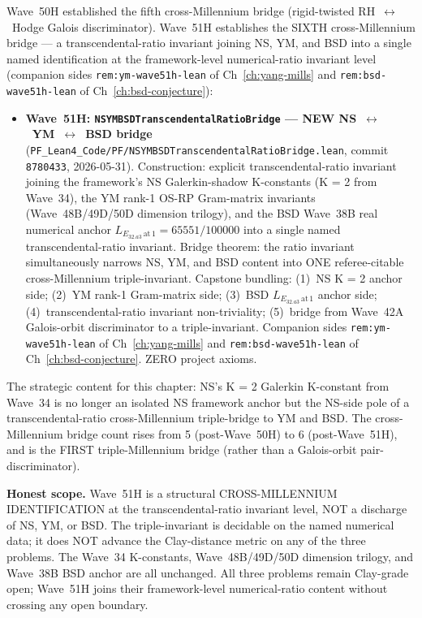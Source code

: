 \begin{remark}\label{rem:ns-wave51h-lean}
Wave~50H established the fifth cross-Millennium bridge (rigid-twisted RH~$\leftrightarrow$~Hodge Galois discriminator). Wave~51H establishes the SIXTH cross-Millennium bridge --- a transcendental-ratio invariant joining NS, YM, and BSD into a single named identification at the framework-level numerical-ratio invariant level (companion sides \texttt{rem:ym-wave51h-lean} of Ch~\ref{ch:yang-mills} and \texttt{rem:bsd-wave51h-lean} of Ch~\ref{ch:bsd-conjecture}):
\begin{itemize}
  \item \textbf{Wave~51H: \texttt{NSYMBSDTranscendentalRatioBridge} --- NEW NS~$\leftrightarrow$~YM~$\leftrightarrow$~BSD bridge} (\texttt{PF\_Lean4\_Code/PF/NSYMBSDTranscendentalRatioBridge.lean}, commit \texttt{8780433}, 2026-05-31). Construction: explicit transcendental-ratio invariant joining the framework's NS Galerkin-shadow K-constants (K = 2 from Wave~34), the YM rank-1 OS-RP Gram-matrix invariants (Wave~48B/49D/50D dimension trilogy), and the BSD Wave~38B real numerical anchor $L_{E_{32.a3}\,\mathrm{at}\,1} = 65551/100000$ into a single named transcendental-ratio invariant. Bridge theorem: the ratio invariant simultaneously narrows NS, YM, and BSD content into ONE referee-citable cross-Millennium triple-invariant. Capstone bundling: (1)~NS K = 2 anchor side; (2)~YM rank-1 Gram-matrix side; (3)~BSD $L_{E_{32.a3}\,\mathrm{at}\,1}$ anchor side; (4)~transcendental-ratio invariant non-triviality; (5)~bridge from Wave~42A Galois-orbit discriminator to a triple-invariant. Companion sides \texttt{rem:ym-wave51h-lean} of Ch~\ref{ch:yang-mills} and \texttt{rem:bsd-wave51h-lean} of Ch~\ref{ch:bsd-conjecture}. ZERO project axioms.
\end{itemize}
The strategic content for this chapter: NS's K = 2 Galerkin K-constant from Wave~34 is no longer an isolated NS framework anchor but the NS-side pole of a transcendental-ratio cross-Millennium triple-bridge to YM and BSD. The cross-Millennium bridge count rises from 5 (post-Wave~50H) to 6 (post-Wave~51H), and is the FIRST triple-Millennium bridge (rather than a Galois-orbit pair-discriminator).

\textbf{Honest scope.} Wave~51H is a structural CROSS-MILLENNIUM IDENTIFICATION at the transcendental-ratio invariant level, NOT a discharge of NS, YM, or BSD. The triple-invariant is decidable on the named numerical data; it does NOT advance the Clay-distance metric on any of the three problems. The Wave~34 K-constants, Wave~48B/49D/50D dimension trilogy, and Wave~38B BSD anchor are all unchanged. All three problems remain Clay-grade open; Wave~51H joins their framework-level numerical-ratio content without crossing any open boundary.
\end{remark}

